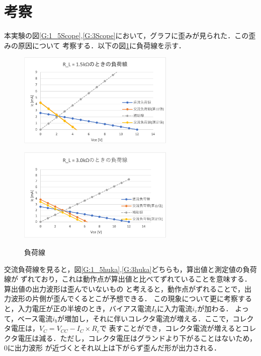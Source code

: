 \documentclass[a4paper,11pt]{jsarticle}
\begin{document}
\section{考察}
本実験の図\ref{G:1_5Scope},\ref{G:3Scope}において，グラフに歪みが見られた．この歪みの原因について
考察する．以下の図\ref{G:hukasen}に負荷線を示す．
\begin{figure}[H]
  \begin{minipage}{0.48\textwidth}
    \begin{center}
      \includegraphics[clip,width=7.5cm]{picture/G1_5.png}
    \end{center}
    \label{G:1_5huka}
  \end{minipage}
  \begin{minipage}{0.48\textwidth}
    \begin{center}
      \includegraphics[clip,width=7.5cm]{picture/G3.png}
    \end{center}
    \label{G:3huka}
  \end{minipage}
  \caption{負荷線}
  \label{G:hukasen}
\end{figure}\par
交流負荷線を見ると，図\ref{G:1_5huka},\ref{G:3huka}どちらも，算出値と測定値の負荷線が
ずれており，これは動作点が算出値と比べてずれていることを意味する．算出値の出力波形は歪んでいないもの
と考えると，動作点がずれることで，出力波形の片側が歪んでくるとこが予想できる．
この現象について更に考察すると，入力電圧が正の半坡のとき，バイアス電流$I_b$に入力電流$i_v$が加わる．
よって，ベース電流$i_b$が増加し，それに伴いコレクタ電流が増える．ここで，コレクタ電圧は，$V_C=V_{CC}-I_C\times R_c$で
表すことができ，コレクタ電流が増えるとコレクタ電圧は減る．ただし，コレクタ電圧はグランドより下がることはないため，0に出力波形
が近づくとそれ以上は下がらず歪んだ形が出力される．~\cite{uni}
\end{document}
